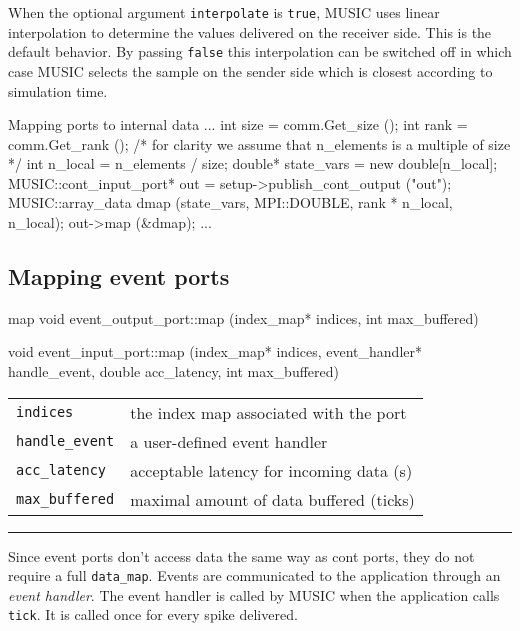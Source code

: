 \documentclass[a4paper]{report}
\makeatletter
\newenvironment{parameters}%
{\begin{tabular}{@{\hspace{2em}}lp{0.6\textwidth}}}%
{\end{tabular}\par\vspace{1mm}\par\hrule\par\vspace{5mm}}
\makeatother
\begin{document}
When the optional argument \lstinline|interpolate| is
\lstinline|true|, MUSIC uses linear interpolation to determine the
values delivered on the receiver side.  This is the default behavior.
By passing \lstinline|false| this interpolation can be switched off in
which case MUSIC selects the sample on the sender side which is
closest according to simulation time.



\begin{code}{Mapping ports to internal data\label{code:mapping}}
{
  ...
  int size = comm.Get_size ();
  int rank = comm.Get_rank ();
  /* for clarity we assume that n_elements
     is a multiple of size */
  int n_local = n_elements / size;
  double* state_vars = new double[n_local];
  MUSIC::cont_input_port* out =
     setup->publish_cont_output ("out");
  MUSIC::array_data dmap (state_vars, MPI::DOUBLE,
                          rank * n_local, n_local);
  out->map (&dmap);
  ...
}
\end{code}


\subsection{Mapping event ports}

\begin{head}{map}
  void event_output_port::map (index_map* indices,
                               int max_buffered)

  void event_input_port::map (index_map* indices,
                              event_handler* handle_event,
                              double acc_latency,
                              int max_buffered)
\end{head}
\begin{parameters}
  \lstinline|indices| & the index map associated with the port \\
  \lstinline|handle_event| & a user-defined event handler \\
  \lstinline|acc_latency| & acceptable latency for incoming data (s) \\
  \lstinline|max_buffered| & maximal amount of data buffered (ticks) \\
\end{parameters}

Since event ports don't access data the same way as cont ports, they
do not require a full \lstinline|data_map|.  Events are communicated
to the application through an \emph{event handler}.  The event handler is called by MUSIC when the application
calls \lstinline|tick|.  It is called once for every spike delivered.
\end{document}
